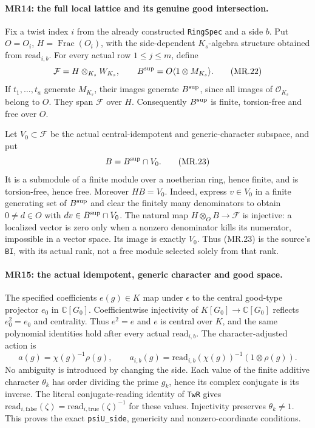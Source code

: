 \paragraph{MR14: the full local lattice and its genuine good intersection.}
Fix a twist index $i$ from the already constructed \texttt{RingSpec}
and a side $b$. Put $O=O_i$, $H=\operatorname{Frac}(O_i)$, with
the side-dependent $K_s$-algebra structure obtained from
$\mathrm{read}_{i,b}$. For every actual row $1\le j\le m$, define
\[
 \mathcal F=H\otimes_{K_s}W_{K_s},\qquad
 B^{\rm sup}=O\langle1\otimes M_{K_s}\rangle.        \tag{MR.22}
\]
If $t_1,\ldots,t_a$ generate $M_{K_s}$, their images generate
$B^{\rm sup}$, since all images of $\mathcal O_{K_s}$ belong to
$O$. They span $\mathcal F$ over $H$. Consequently $B^{\rm sup}$
is finite, torsion-free and free over $O$.

Let $V_0\subset\mathcal F$ be the actual central-idempotent and
generic-character subspace, and put
\[
                       B=B^{\rm sup}\cap V_0.       \tag{MR.23}
\]
It is a submodule of a finite module over a noetherian ring, hence
finite, and is torsion-free, hence free. Moreover $HB=V_0$.
Indeed, express $v\in V_0$ in a finite generating set of
$B^{\rm sup}$ and clear the finitely many denominators to obtain
$0\ne d\in O$ with $dv\in B^{\rm sup}\cap V_0$.
The natural map $H\otimes_O B\to\mathcal F$ is injective:
a localized vector is zero only when a nonzero denominator kills
its numerator, impossible in a vector space. Its image is exactly
$V_0$. Thus (MR.23) is the source's \texttt{BI}, with its actual
rank, not a free module selected solely from that rank.

\paragraph{MR15: the actual idempotent, generic character and good space.}
The specified coefficients $e(g)\in K$ map under $\epsilon$ to
the central good-type projector $e_0$ in $\mathbb C[G_0]$.
Coefficientwise injectivity of $K[G_0]\to\mathbb C[G_0]$ reflects
$e_0^2=e_0$ and centrality. Thus $e^2=e$ and $e$ is central over
$K$, and the same polynomial identities hold after every actual
$\mathrm{read}_{i,b}$. The character-adjusted action is
\[
       a(g)=\chi(g)^{-1}\rho(g),\qquad
       a_{i,b}(g)=\mathrm{read}_{i,b}(\chi(g))^{-1}
                                      (1\otimes\rho(g)).\tag{MR.24}
\]
No ambiguity is introduced by changing the side. Each value of the
finite additive character $\theta_k$ has order dividing the prime
$g_k$, hence its complex conjugate is its inverse. The literal
conjugate-reading identity of \texttt{TwR} gives
$\mathrm{read}_{i,\mathrm{false}}(\zeta)
=\mathrm{read}_{i,\mathrm{true}}(\zeta)^{-1}$ for these values.
Injectivity preserves $\theta_k\ne1$. This proves the exact
\texttt{psiU\_side}, genericity and nonzero-coordinate conditions.

